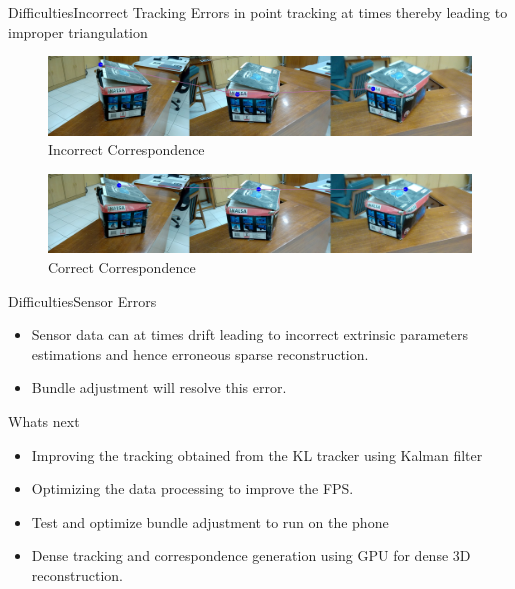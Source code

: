 \documentclass{beamer}
\begin{document}
\begin{frame}{Difficulties}{Incorrect Tracking}
    Errors in point tracking at times thereby leading to improper triangulation 
    \begin{figure}[ht!]
          \centering
          \includegraphics[width=1.0\linewidth]{00018.jpg}
          \caption{Incorrect Correspondence}
    \end{figure}
    \begin{figure}
          \centering
          \includegraphics[width=1.0\linewidth]{00027.jpg}
          \caption{Correct Correspondence}
    \end{figure}
\end{frame}

\begin{frame}{Difficulties}{Sensor Errors}
  \begin{itemize}
    \item
    Sensor data can at times drift leading to incorrect extrinsic parameters estimations and hence erroneous sparse reconstruction.
    \item   Bundle adjustment will resolve this error.
  \end{itemize}

\end{frame}

\begin{frame}{Whats next}{}
	\begin{itemize}
		\item Improving the tracking obtained from the KL tracker using Kalman filter
		\item Optimizing the data processing to improve the FPS. 
    \item Test and optimize bundle adjustment to run on the phone
		\item Dense tracking and correspondence generation using GPU for dense 3D reconstruction.
	\end{itemize}
\end{frame}
\end{document}
